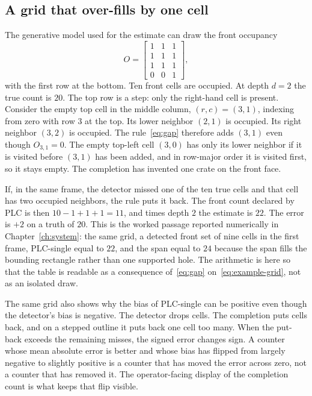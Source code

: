 \subsection{A grid that over-fills by one cell}
\label{sec:plc-example}

The generative model used for the estimate can draw the front occupancy
\begin{equation}
O =
\begin{bmatrix}
1 & 1 & 1 \\
1 & 1 & 1 \\
1 & 1 & 1 \\
0 & 0 & 1
\end{bmatrix},
\label{eq:example-grid}
\end{equation}
with the first row at the bottom. Ten front cells are occupied. At depth $d=2$ the true count is $20$. The top row is a step: only the right-hand cell is present. Consider the empty top cell in the middle column, $(r,c)=(3,1)$, indexing from zero with row $3$ at the top. Its lower neighbor $(2,1)$ is occupied. Its right neighbor $(3,2)$ is occupied. The rule~\eqref{eq:gap} therefore adds $(3,1)$ even though $O_{3,1}=0$. The empty top-left cell $(3,0)$ has only its lower neighbor if it is visited before $(3,1)$ has been added, and in row-major order it is visited first, so it stays empty. The completion has invented one crate on the front face.

If, in the same frame, the detector missed one of the ten true cells and that cell has two occupied neighbors, the rule puts it back. The front count declared by PLC is then $10-1+1+1=11$, and times depth $2$ the estimate is $22$. The error is $+2$ on a truth of $20$. This is the worked passage reported numerically in Chapter~\ref{ch:system}: the same grid, a detected front set of nine cells in the first frame, PLC-single equal to $22$, and the span equal to $24$ because the span fills the bounding rectangle rather than one supported hole. The arithmetic is here so that the table is readable as a consequence of~\eqref{eq:gap} on~\eqref{eq:example-grid}, not as an isolated draw.

The same grid also shows why the bias of PLC-single can be positive even though the detector's bias is negative. The detector drops cells. The completion puts cells back, and on a stepped outline it puts back one cell too many. When the put-back exceeds the remaining misses, the signed error changes sign. A counter whose mean absolute error is better and whose bias has flipped from largely negative to slightly positive is a counter that has moved the error across zero, not a counter that has removed it. The operator-facing display of the completion count is what keeps that flip visible.

